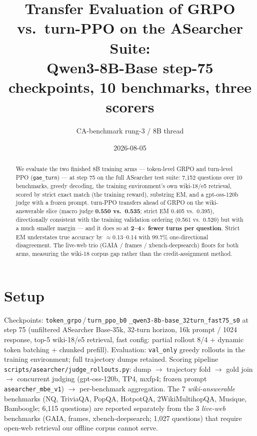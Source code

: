 \documentclass[10pt]{article}
\title{\vspace{-1.2em}Transfer Evaluation of GRPO vs.\ turn-PPO on the ASearcher Suite:\\
Qwen3-8B-Base step-75 checkpoints, 10 benchmarks, three scorers}
\author{CA-benchmark rung-3 / 8B thread}
\date{2026-08-05}
\newcommand{\hw}[1]{\textbf{#1}}
\begin{document}
\maketitle
\vspace{-2em}

\begin{abstract}
We evaluate the two finished 8B training arms --- token-level GRPO and turn-level PPO
(\texttt{gae\_turn}) --- at step 75 on the full ASearcher test suite: 7{,}152 questions
over 10 benchmarks, greedy decoding, the training environment's own wiki-18/e5 retrieval,
scored by strict exact match (the training reward), substring EM, and a gpt-oss-120b judge
with a frozen prompt. turn-PPO transfers ahead of GRPO on the wiki-answerable slice
(macro judge \hw{0.550 vs.\ 0.535}; strict EM 0.405 vs.\ 0.395), directionally consistent
with the training validation ordering (0.561 vs.\ 0.520) but with a much smaller margin ---
and it does so at \hw{2--4$\times$ fewer turns per question}. Strict EM understates true
accuracy by $\approx$0.13--0.14 with 99.7\% one-directional disagreement. The live-web trio
(GAIA / frames / xbench-deepsearch) floors for both arms, measuring the wiki-18 corpus gap
rather than the credit-assignment method.
\end{abstract}

\section*{Setup}
Checkpoints: \texttt{token\_grpo}\,/\,\texttt{turn\_ppo\_b0}
\texttt{\_qwen3-8b-base\_32turn\_fast75\_s0} at step 75 (unfiltered ASearcher Base-35k,
32-turn horizon, 16k prompt / 1024 response, top-5 wiki-18/e5 retrieval, fast config:
partial rollout 8/4 + dynamic token batching + chunked prefill). Evaluation:
\texttt{val\_only} greedy rollouts in the training environment; full trajectory dumps
retained. Scoring pipeline \texttt{scripts/asearcher/judge\_rollouts.py}: dump
$\rightarrow$ trajectory fold $\rightarrow$ gold join $\rightarrow$ concurrent judging
(gpt-oss-120b, TP4, mxfp4; frozen prompt \texttt{asearcher\_mbe\_v1}) $\rightarrow$
per-benchmark aggregation. The 7 \emph{wiki-answerable} benchmarks (NQ, TriviaQA, PopQA,
HotpotQA, 2WikiMultihopQA, Musique, Bamboogle; 6{,}115 questions) are reported separately
from the 3 \emph{live-web} benchmarks (GAIA, frames, xbench-deepsearch; 1{,}027 questions)
that require open-web retrieval our offline corpus cannot serve.
\end{document}
